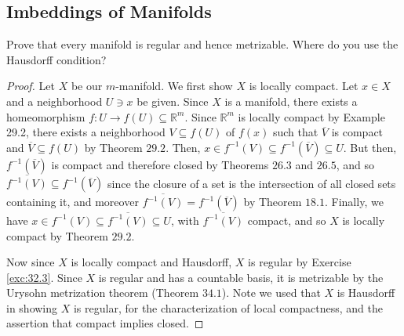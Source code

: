 \documentclass[12pt]{article}
\theoremstyle{remark}
\begin{document}
\setcounter{subsection}{35}
\subsection{Imbeddings of Manifolds}
\begin{problem}
  Prove that every manifold is regular and hence metrizable. Where do you use the Hausdorff condition?
\end{problem}
\begin{proof}
  Let $X$ be our $m$-manifold. We first show $X$ is locally compact. Let $x \in
  X$ and a neighborhood $U \ni x$ be given. Since $X$ is a manifold, there
  exists a homeomorphism $f\colon U \to f(U) \subseteq \mathbb{R}^m$. Since $\mathbb{R}^m$ is locally compact by Example 29.2, there exists a neighborhood $V \subseteq f(U)$ of $f(x)$ such that $\overline{V}$ is compact and $\overline{V} \subseteq f(U)$ by Theorem $29.2$. Then, $x \in f^{-1}(V) \subseteq f^{-1}(\overline{V}) \subseteq U$. But then, $f^{-1}(\overline{V})$ is compact and therefore closed by Theorems $26.3$ and $26.5$, and so $\overline{f^{-1}(V)} \subseteq f^{-1}(\overline{V})$ since the closure of a set is the intersection of all closed sets containing it, and moreover $\overline{f^{-1}(V)} = f^{-1}(\overline{V})$ by Theorem $18.1$. Finally, we have $x \in f^{-1}(V) \subseteq \overline{f^{-1}(V)} \subseteq U$, with $\overline{f^{-1}(V)}$ compact, and so $X$ is locally compact by Theorem $29.2$.
  \par Now since $X$ is locally compact and Hausdorff, $X$ is regular by
  Exercise \ref{exc:32.3}. Since $X$ is regular and has a countable basis, it is
  metrizable by the Urysohn metrization theorem (Theorem $34.1$). Note we used
  that $X$ is Hausdorff in showing $X$ is regular, for the characterization of
  local compactness, and the assertion that compact implies closed.
\end{proof}
\end{document}
